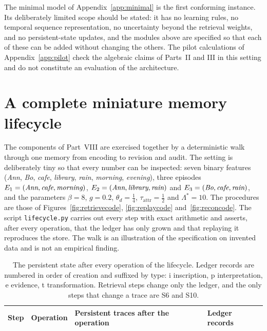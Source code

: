 The minimal model of Appendix~\ref{app:minimal} is the first conforming instance. Its deliberately limited scope should be stated: it has no learning rules, no temporal sequence representation, no uncertainty beyond the retrieval weights, and no persistent-state updates, and the modules above are specified so that each of these can be added without changing the others. The pilot calculations of Appendix~\ref{app:pilot} check the algebraic claims of Parts~II and III in this setting and do not constitute an evaluation of the architecture.

\section*{A complete miniature memory lifecycle}\label{sec:lifecycle}

The components of Part~VIII are exercised together by a deterministic walk through one memory from encoding to revision and audit. The setting is deliberately tiny so that every number can be inspected: seven binary features (\emph{Ann}, \emph{Bo}, \emph{cafe}, \emph{library}, \emph{rain}, \emph{morning}, \emph{evening}), three episodes $E_1=(\emph{Ann},\emph{cafe},\emph{morning})$, $E_2=(\emph{Ann},\emph{library},\emph{rain})$ and $E_3=(\emph{Bo},\emph{cafe},\emph{rain})$, and the parameters $\beta=8$, $g=0.2$, $\theta_d=\tfrac14$, $\tau_{\mathrm{attr}}=\tfrac12$ and $\Lambda^\ast=10$. The procedures are those of Figures~\ref{fig:retrievecode}, \ref{fig:replaycode} and~\ref{fig:reconcode}. The script \texttt{lifecycle.py} carries out every step with exact arithmetic and asserts, after every operation, that the ledger has only grown and that replaying it reproduces the store. The walk is an illustration of the specification on invented data and is not an empirical finding.

\begin{table}[p]
\centering
\small
\renewcommand{\arraystretch}{1.2}
\begin{tabular}{@{}l p{3.0cm} p{5.2cm} p{2.6cm}@{}}
\toprule
Step & Operation & Persistent traces after the operation & Ledger records \\
\midrule

\end{tabular}
\caption{The persistent state after every operation of the lifecycle. Ledger records are numbered in order of creation and suffixed by type: i inscription, p interpretation, e evidence, t transformation. Retrieval steps change only the ledger, and the only steps that change a trace are S6 and S10.}\label{tab:lifecycle}
\end{table}

